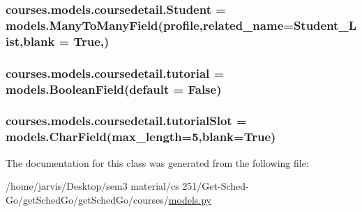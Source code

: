 \subsubsection[{\texorpdfstring{Student}{Student}}]{\setlength{\rightskip}{0pt plus 5cm}courses.\+models.\+coursedetail.\+Student = models.\+Many\+To\+Many\+Field({\bf profile},related\+\_\+name=\textquotesingle{}Student\+\_\+\+List\textquotesingle{},blank = True,)\hspace{0.3cm}{\ttfamily [static]}}\hypertarget{classcourses_1_1models_1_1coursedetail_a05149c0617696650da4bf98364ff4cee}{}\label{classcourses_1_1models_1_1coursedetail_a05149c0617696650da4bf98364ff4cee}
\subsubsection[{\texorpdfstring{tutorial}{tutorial}}]{\setlength{\rightskip}{0pt plus 5cm}courses.\+models.\+coursedetail.\+tutorial = models.\+Boolean\+Field(default = False)\hspace{0.3cm}{\ttfamily [static]}}\hypertarget{classcourses_1_1models_1_1coursedetail_a82d72338e090a124f3b2e09d02f38f79}{}\label{classcourses_1_1models_1_1coursedetail_a82d72338e090a124f3b2e09d02f38f79}
\subsubsection[{\texorpdfstring{tutorial\+Slot}{tutorialSlot}}]{\setlength{\rightskip}{0pt plus 5cm}courses.\+models.\+coursedetail.\+tutorial\+Slot = models.\+Char\+Field(max\+\_\+length=5,blank=True)\hspace{0.3cm}{\ttfamily [static]}}\hypertarget{classcourses_1_1models_1_1coursedetail_ad96479a724c4804c3ab0ca04376ce50c}{}\label{classcourses_1_1models_1_1coursedetail_ad96479a724c4804c3ab0ca04376ce50c}


The documentation for this class was generated from the following file\+:\begin{DoxyCompactItemize}
\item 
/home/jarvis/\+Desktop/sem3 material/cs 251/\+Get-\/\+Sched-\/\+Go/get\+Sched\+Go/get\+Sched\+Go/courses/\hyperlink{courses_2models_8py}{models.\+py}\end{DoxyCompactItemize}
